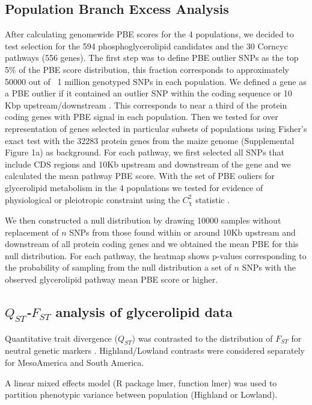 \documentclass[9pt,twocolumn,twoside]{BioRxiv}
\begin{document}
\subsection{Population Branch Excess Analysis}
After calculating genomewide PBE scores for the 4 populations, we decided to test selection for the 594 phosphoglycerolipid candidates and the 30 Corncyc pathways (556 genes). 
The first step was to define PBE outlier SNPs as the top 5\% of the PBE score distribution, this fraction corresponds to approximately 50000 out of ~1 million genotyped SNPs in each population. 
We defined a gene as a PBE outlier if it contained an outlier SNP within the coding sequence or 10 Kbp upstream/downstream  \cite{Wang2020-mp}. 
This corresponds to near a third of the protein coding genes with PBE signal in each population. 
Then we tested for over representation of genes selected in particular subsets of populations using Fisher's exact test with the 32283 protein genes from the maize genome (Supplemental Figure 1a) \cite{wang2015a} as background. 
For each pathway, we first selected all SNPs that include CDS regions and 10Kb upstream and downstream of the gene and we calculated the mean pathway PBE score. 
With the set of PBE ouliers for glycerolipid metabolism in the 4 populations we tested for evidence of physiological or pleiotropic constraint using the $C_\chi^2$ statistic \cite{yeaman2018}. 

We then constructed a null distribution by drawing 10000 samples without replacement of $n$ SNPs from those found within or around 10Kb upstream and downstream of all protein coding genes and we obtained the mean PBE for this null distribution. 
For each pathway, the heatmap shows p-values corresponding to the probability of sampling from the null distribution a set of $n$ SNPs with the observed glycerolipid pathway mean PBE score or higher.



\subsection{\textit{$Q_{ST}$-$F_{ST}$} analysis of glycerolipid data}

Quantitative trait divergence ($Q_{ST}$) was contrasted to the distribution of $F_{ST}$ for neutral genetic markers \citep{whitlock2008evolutionary}.
Highland/Lowland contrasts were considered separately for MesoAmerica and South America.

A linear mixed effects model (R package lmer, function lmer) was used to partition phenotypic variance between population (Highland or Lowland).
\end{document}
